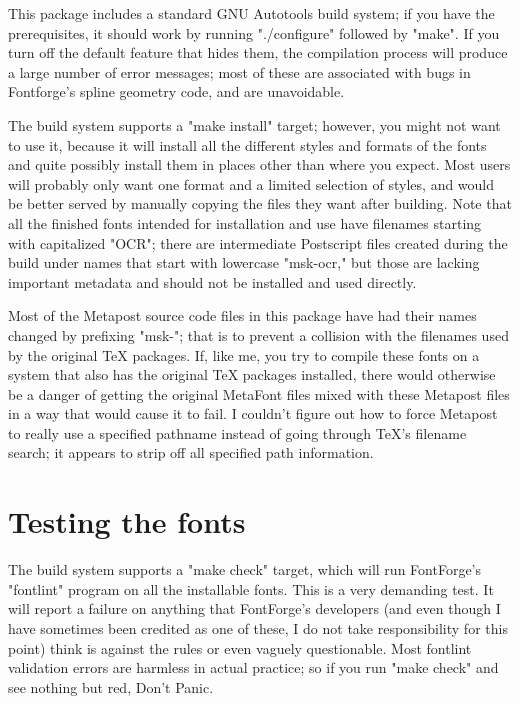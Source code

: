 \documentclass{article}
\begin{document}
This package includes a standard GNU Autotools build system; if you have the
prerequisites, it should work by running "./configure" followed by "make". 
If you turn off the default feature that hides them, the compilation process
will produce a large number of error messages; most of these are associated
with bugs in Fontforge's spline geometry code, and are unavoidable.

The build system supports a "make install" target; however, you might not
want to use it, because it will install all the different styles and
formats of the fonts and quite possibly install them in places other than
where you expect.  Most users will probably only want one format and a
limited selection of styles, and would be better served by manually copying
the files they want after building.  Note that all the finished fonts
intended for installation and use have filenames starting with capitalized
"OCR"; there are intermediate Postscript files created during the build
under names that start with lowercase "msk-ocr," but those are lacking
important metadata and should not be installed and used directly.

Most of the Metapost source code files in this package
have had their names changed by prefixing "msk-"; that is to prevent a
collision with the filenames used by the original TeX packages.  If, like
me, you try to compile these fonts on a system that also has the original
TeX packages installed, there would otherwise be a danger of getting the
original MetaFont files mixed with these Metapost files in a way that would
cause it to fail.  I couldn't figure out how to force Metapost to really
use a specified pathname instead of going through TeX's filename search; it
appears to strip off all specified path information.

\section{Testing the fonts}

The build system supports a "make check" target, which will run FontForge's
"fontlint" program on all the installable fonts.  This is a very demanding
test.  It will report a failure on anything that FontForge's developers (and
even though I have sometimes been credited as one of these, I do not take
responsibility for this point) think is against the rules or even vaguely
questionable.  Most fontlint validation errors are harmless in actual
practice; so if you run "make check" and see nothing but red, Don't Panic.
\end{document}
